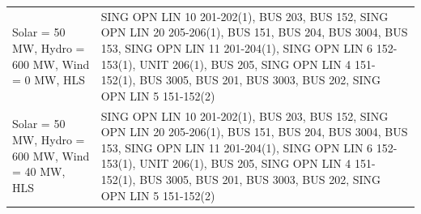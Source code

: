 \documentclass[10pt]{report}
\begin{document}
\begin{table}[H]
{\begin{tabular}{lp{17cm}}
Solar = 50 MW, Hydro = 600 MW, Wind = 0 MW, HLS & SING OPN LIN   10 201-202(1), BUS 203, BUS 152, SING OPN LIN   20 205-206(1), BUS 151, BUS 204, BUS 3004, BUS 153, SING OPN LIN   11 201-204(1), SING OPN LIN   6 152-153(1), UNIT 206(1), BUS 205, SING OPN LIN   4 151-152(1), BUS 3005, BUS 201, BUS 3003, BUS 202, SING OPN LIN   5 151-152(2) \\
Solar = 50 MW, Hydro = 600 MW, Wind = 40 MW, HLS & SING OPN LIN   10 201-202(1), BUS 203, BUS 152, SING OPN LIN   20 205-206(1), BUS 151, BUS 204, BUS 3004, BUS 153, SING OPN LIN   11 201-204(1), SING OPN LIN   6 152-153(1), UNIT 206(1), BUS 205, SING OPN LIN   4 151-152(1), BUS 3005, BUS 201, BUS 3003, BUS 202, SING OPN LIN   5 151-152(2) \\
\bottomrule
\end{tabular}}
\end{table}
\end{document}
